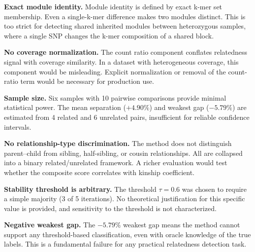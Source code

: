 \documentclass{../yalumba}
\begin{document}
\begin{limitation}
\textbf{Exact module identity.}  Module identity is defined by exact k-mer set
membership.  Even a single-k-mer difference makes two modules distinct.  This
is too strict for detecting shared inherited modules between heterozygous
samples, where a single SNP changes the k-mer composition of a shared block.
\end{limitation}

\begin{limitation}
\textbf{No coverage normalization.}  The count ratio component conflates
relatedness signal with coverage similarity.  In a dataset with heterogeneous
coverage, this component would be misleading.  Explicit normalization or
removal of the count-ratio term would be necessary for production use.
\end{limitation}

\begin{limitation}
\textbf{Sample size.}  Six samples with 10 pairwise comparisons provide
minimal statistical power.  The mean separation ($+4.90\%$) and weakest gap
($-5.79\%$) are estimated from 4 related and 6 unrelated pairs, insufficient
for reliable confidence intervals.
\end{limitation}

\begin{limitation}
\textbf{No relationship-type discrimination.}  The method does not distinguish
parent--child from sibling, half-sibling, or cousin relationships.  All are
collapsed into a binary related/unrelated framework.  A richer evaluation would
test whether the composite score correlates with kinship coefficient.
\end{limitation}

\begin{limitation}
\textbf{Stability threshold is arbitrary.}  The threshold $\tau = 0.6$ was
chosen to require a simple majority (3 of 5 iterations).  No theoretical
justification for this specific value is provided, and sensitivity to the
threshold is not characterized.
\end{limitation}

\begin{limitation}
\textbf{Negative weakest gap.}  The $-5.79\%$ weakest gap means the method
cannot support any threshold-based classification, even with oracle knowledge
of the true labels.  This is a fundamental failure for any practical
relatedness detection task.
\end{limitation}
\end{document}
